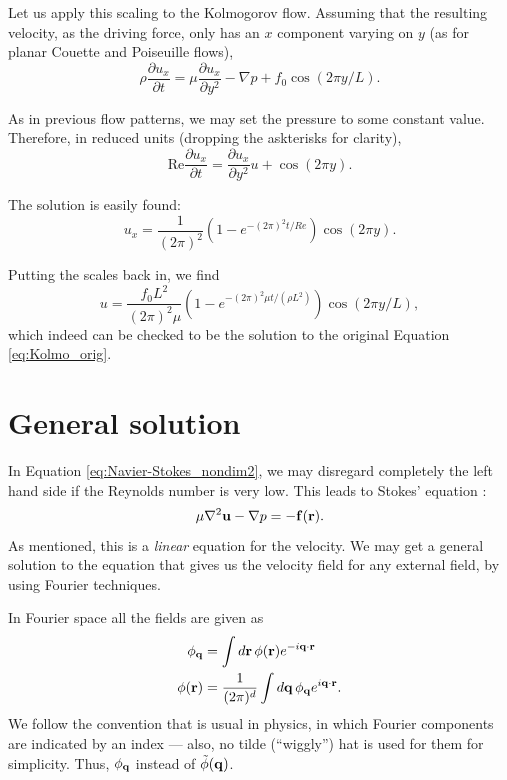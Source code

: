 Let us apply this scaling to the Kolmogorov flow. Assuming that the
resulting velocity, as the driving force, only has an $x$ component
varying on $y$ (as for planar Couette and Poiseuille flows),
\begin{equation}
\label{eq:Kolmo_orig}
  \rho \frac{\partial u_x}{\partial t} =
  \mu \frac{\partial u_x}{\partial y^2} - \nabla p +   f_0 \cos(2\pi y/L)  .
\end{equation}

As in previous flow patterns, we may set the pressure to some constant
value. Therefore, in reduced units (dropping the askterisks for
clarity),
\[
  \mathrm{Re} \frac{\partial u_x}{\partial t} =
  \frac{\partial  u_x}{\partial y^2} u + \cos(2\pi y) .
\]

The solution is easily found:
\[
  u_x = \frac{1}{(2\pi)^2} \left( 1-e^{ - (2\pi)^2 t/Re } \right)
  \cos(2\pi y) .
\]

Putting the scales back in, we find
\[
  u = \frac{ f_0 L^2 }{(2\pi)^2 \mu} \left( 1-e^{- (2\pi)^2 \mu t /
      (\rho L^2) } \right) \cos(2\pi y/L) ,
\]
which indeed can be checked to be the solution to the original
Equation \ref{eq:Kolmo_orig}.


\section{General solution}

In Equation \ref{eq:Navier-Stokes_nondim2}, we may disregard
completely the left hand side if the Reynolds number is very low. This
leads to Stokes' equation :
\begin{equation}
  \label{eq:Stokes}
  \mu \nabla^2 \mathbf{u} -\nabla p = - \mathbf{f}(\mathbf{r}) .
\end{equation}
As mentioned, this is a \emph{linear} equation for the velocity.  We
may get a general solution to the equation that gives us the velocity
field for any external field, by using Fourier techniques.

In Fourier space all the fields are given as 
\begin{align}
  \label{eq:F_r_to_q}
  \phi_{\mathbf{q}} &=                    \int d\mathbf{r} \, \phi(\mathbf{r}) e^{-i\mathbf{q}\cdot\mathbf{r}}  \\
  \label{eq:F_q_to_r}
  \phi(\mathbf{r}) &= \frac 1{(2\pi)^d}  \int d\mathbf{q} \, \phi_{\mathbf{q}} e^{ i\mathbf{q}\cdot\mathbf{r}} .
\end{align}
We follow the convention that is usual in physics, in which Fourier
components are indicated by an index --- also, no tilde (``wiggly'')
hat is used for them for simplicity. Thus, $ \phi_{\mathbf{q}} $ instead of
$ \tilde{\phi}(\mathbf{q}) $.

